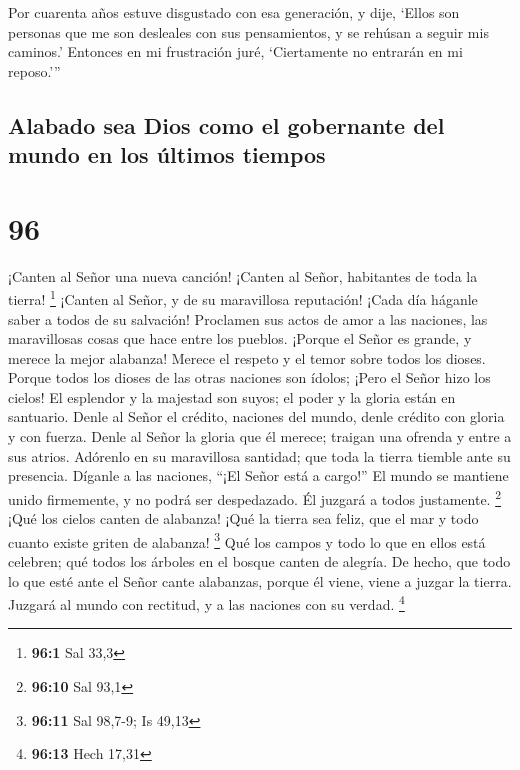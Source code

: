  Por cuarenta años estuve disgustado con esa generación, y
dije, `Ellos son personas que me son desleales con sus pensamientos, y
se rehúsan a seguir mis caminos.'  Entonces en mi
frustración juré, `Ciertamente no entrarán en mi reposo.'''

\hypertarget{alabado-sea-dios-como-el-gobernante-del-mundo-en-los-uxfaltimos-tiempos}{%
\subsection{Alabado sea Dios como el gobernante del mundo en los últimos
tiempos}\label{alabado-sea-dios-como-el-gobernante-del-mundo-en-los-uxfaltimos-tiempos}}

\hypertarget{section-95}{%
\section{96}\label{section-95}}

 ¡Canten al Señor una nueva canción! ¡Canten al Señor,
habitantes de toda la tierra! \footnote{\textbf{96:1} Sal 33,3}
 ¡Canten al Señor, y de su maravillosa reputación! ¡Cada día
háganle saber a todos de su salvación!  Proclamen sus actos
de amor a las naciones, las maravillosas cosas que hace entre los
pueblos.  ¡Porque el Señor es grande, y merece la mejor
alabanza! Merece el respeto y el temor sobre todos los dioses.
 Porque todos los dioses de las otras naciones son ídolos;
¡Pero el Señor hizo los cielos!  El esplendor y la majestad
son suyos; el poder y la gloria están en santuario.  Denle
al Señor el crédito, naciones del mundo, denle crédito con gloria y con
fuerza.  Denle al Señor la gloria que él merece; traigan una
ofrenda y entre a sus atrios.  Adórenlo en su maravillosa
santidad; que toda la tierra tiemble ante su presencia. 
Díganle a las naciones, ``¡El Señor está a cargo!'' El mundo se mantiene
unido firmemente, y no podrá ser despedazado. Él juzgará a todos
justamente. \footnote{\textbf{96:10} Sal 93,1}  ¡Qué los
cielos canten de alabanza! ¡Qué la tierra sea feliz, que el mar y todo
cuanto existe griten de alabanza! \footnote{\textbf{96:11} Sal 98,7-9;
  Is 49,13}  Qué los campos y todo lo que en ellos está
celebren; qué todos los árboles en el bosque canten de alegría.
 De hecho, que todo lo que esté ante el Señor cante
alabanzas, porque él viene, viene a juzgar la tierra. Juzgará al mundo
con rectitud, y a las naciones con su verdad. \footnote{\textbf{96:13}
  Hech 17,31}

